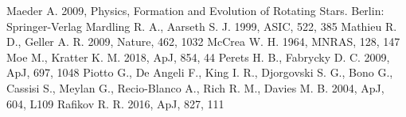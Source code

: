 \documentclass{aastex62}
\begin{document}
\begin{thebibliography}{}
 Maeder A. 2009, 
Physics, Formation and Evolution of Rotating Stars. Berlin: Springer-Verlag
 Mardling R. A., Aarseth S. J. 1999, ASIC, 522, 385  
  Mathieu R. D., Geller A. R. 2009, Nature, 462, 1032
 McCrea
  W. H. 1964, MNRAS, 128, 147
 Moe M., Kratter K. M. 2018, ApJ, 854, 44 
 Perets H. B., Fabrycky D. C. 2009, ApJ, 697, 1048
  Piotto G., De Angeli F., King I. R., Djorgovski S. G., Bono G.,
  Cassisi S., Meylan G., Recio-Blanco A., Rich R. M., Davies M. B. 2004,
  ApJ, 604, L109
 Rafikov R. R. 2016, ApJ, 827, 111 

\end{thebibliography}
\end{document}
